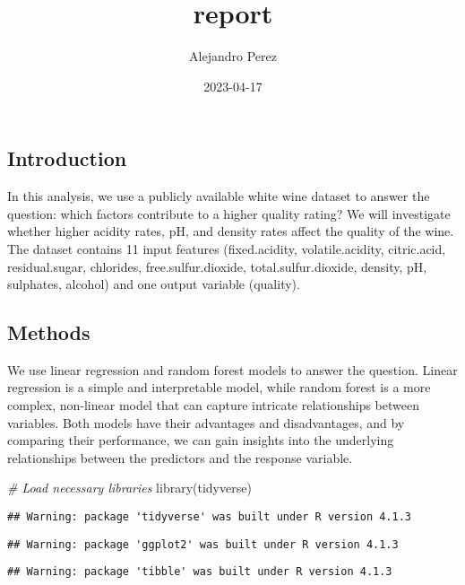 \documentclass[
]{article}
\title{report}
\author{Alejandro Perez}
\date{2023-04-17}
\newenvironment{Shaded}{\begin{snugshade}}{\end{snugshade}}
\newcommand{\CommentTok}[1]{\textcolor[rgb]{0.56,0.35,0.01}{\textit{#1}}}
\newcommand{\FunctionTok}[1]{\textcolor[rgb]{0.00,0.00,0.00}{#1}}
\newcommand{\NormalTok}[1]{#1}
\begin{document}
\maketitle

\hypertarget{introduction}{%
\subsection{Introduction}\label{introduction}}

In this analysis, we use a publicly available white wine dataset to
answer the question: which factors contribute to a higher quality
rating? We will investigate whether higher acidity rates, pH, and
density rates affect the quality of the wine. The dataset contains 11
input features (fixed.acidity, volatile.acidity, citric.acid,
residual.sugar, chlorides, free.sulfur.dioxide, total.sulfur.dioxide,
density, pH, sulphates, alcohol) and one output variable (quality).

\hypertarget{methods}{%
\subsection{Methods}\label{methods}}

We use linear regression and random forest models to answer the
question. Linear regression is a simple and interpretable model, while
random forest is a more complex, non-linear model that can capture
intricate relationships between variables. Both models have their
advantages and disadvantages, and by comparing their performance, we can
gain insights into the underlying relationships between the predictors
and the response variable.

\begin{Shaded}
\begin{Highlighting}[]
\CommentTok{\# Load necessary libraries}
\FunctionTok{library}\NormalTok{(tidyverse)}
\end{Highlighting}
\end{Shaded}

\begin{verbatim}
## Warning: package 'tidyverse' was built under R version 4.1.3
\end{verbatim}

\begin{verbatim}
## Warning: package 'ggplot2' was built under R version 4.1.3
\end{verbatim}

\begin{verbatim}
## Warning: package 'tibble' was built under R version 4.1.3
\end{verbatim}
\end{document}
